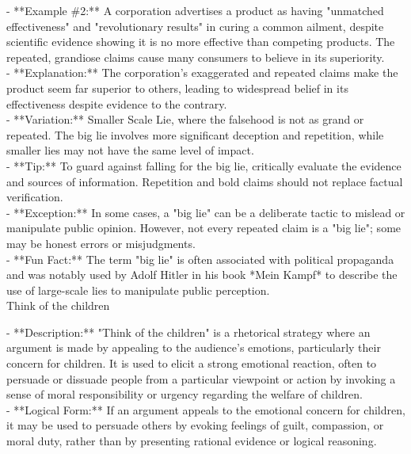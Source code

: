 \documentclass[a4paper,12pt,single,pdftex]{scrartcl}
\begin{document}
    
      - **Example \#2:** A corporation advertises a product as having "unmatched effectiveness" and "revolutionary results" in curing a common ailment, despite scientific evidence showing it is no more effective than competing products. The repeated, grandiose claims cause many consumers to believe in its superiority.
    \\

    
      - **Explanation:** The corporation’s exaggerated and repeated claims make the product seem far superior to others, leading to widespread belief in its effectiveness despite evidence to the contrary.
    \\

    
      - **Variation:** Smaller Scale Lie, where the falsehood is not as grand or repeated. The big lie involves more significant deception and repetition, while smaller lies may not have the same level of impact.
    \\

    
      - **Tip:** To guard against falling for the big lie, critically evaluate the evidence and sources of information. Repetition and bold claims should not replace factual verification.
    \\

    
      - **Exception:** In some cases, a "big lie" can be a deliberate tactic to mislead or manipulate public opinion. However, not every repeated claim is a "big lie"; some may be honest errors or misjudgments.
    \\

    
      - **Fun Fact:** The term "big lie" is often associated with political propaganda and was notably used by Adolf Hitler in his book *Mein Kampf* to describe the use of large-scale lies to manipulate public perception.
    \\

  

Think of the children
    
      - **Description:** "Think of the children" is a rhetorical strategy where an argument is made by appealing to the audience’s emotions, particularly their concern for children. It is used to elicit a strong emotional reaction, often to persuade or dissuade people from a particular viewpoint or action by invoking a sense of moral responsibility or urgency regarding the welfare of children.
    \\

    
      - **Logical Form:** If an argument appeals to the emotional concern for children, it may be used to persuade others by evoking feelings of guilt, compassion, or moral duty, rather than by presenting rational evidence or logical reasoning.
    \\
\end{document}
